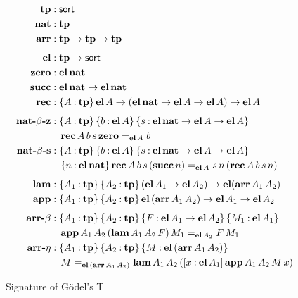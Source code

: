 \documentclass[11pt,twoside]{article}
\newcommand{\braces}[1]{\{#1\}}
\newcommand{\bracks}[1]{[#1]}
\newcommand{\parens}[1]{(#1)}
\newcommand{\sortclass}{\ensuremath{\textsf{sort}}}
\newcommand{\eqclass}[3]{{#2}=_{#1}{#3}}
\newcommand{\piclass}[3]{\braces{{#2}\mathbin{:}{#1}}\,{#3}}
\newcommand{\arrclass}[2]{{#1}\to{#2}}
\newcommand{\lamobj}[3]{\bracks{{#2}\mathbin{:}{#1}}\,{#3}}
\newcommand{\appobj}[2]{{#1}\,{#2}}
\begin{document}
\begin{figure}
  
  \begin{align*}
    \tpsort
    & : \sortclass \\
    \nattp
    & : \tpsort \\
    \arrtp
    & : \arrclass{\tpsort}{\arrclass{\tpsort}{\tpsort}} \\[1ex]
    \elfam
%
    & : \arrclass{\tpsort}{\sortclass} \\
    \zerocon
    & : \elof{\nattp} \\
    \succcon
    & : \arrclass {\elof{\nattp}}{\elof{\nattp}} \\
    \reccon
    &  :
      \piclass{\tpsort}{A}{
      \arrclass{\elof{A}}{
      \arrclass{\parens{\arrclass{\elof{\nattp}}{\arrclass{\elof{A}}{\elof{A}}}}}{
      \elof{A}}}} \\[1ex] 
%
    \natbetaz
    & :
      \piclass{\tpsort}{A}{
      \piclass{\elof{A}}{b}{
      \piclass{\arrclass{\elof{\nattp}}{\arrclass{\elof{A}}{\elof{A}}}}{s}{
      }}} \\
    & \quad
      \eqclass{\elof{A}}{\recof{A}{b}{s}{\zerocon}}{b} \\
    \natbetas
    & :
      \piclass{\tpsort}{A}{
      \piclass{\elof{A}}{b}{
      \piclass{\arrclass{\elof{\nattp}}{\arrclass{\elof{A}}{\elof{A}}}}{s}{
      }}} \\
    & \quad
      \piclass{\elof{\nattp}}{n}{
      \eqclass{\elof{A}}
      {\recof{A}{b}{s}{\parens{\succof{n}}}}
      {\appobj{\appobj{s}{n}}{\parens{\recof{A}{b}{s}{n}}}}} \\[1ex]
%
    \lamcon
    & :
      \piclass{\tpsort}{A_{1}}{
      \piclass{\tpsort}{A_{2}}{
      \arrclass{\parens{\arrclass{\elof{A_{1}}}{\elof{A_{2}}}}}{
      \elfam{\parens{\arrof{A_{1}}{A_{2}}}}}}} \\
    \appcon
    & :
      \piclass{\tpsort}{A_{1}}{
      \piclass{\tpsort}{A_{2}}{
      \arrclass{\elofp{\arrof{A_{1}}{A_{2}}}}{
      \arrclass{\elof{A_{1}}}{\elof{A_{2}}}}}} \\[1ex]
%
    \arrbeta
    & :
      \piclass{\tpsort}{A_{1}}{
      \piclass{\tpsort}{A_{2}}{
      \piclass{\arrclass{\elof{A_{1}}}{\elof{A_{2}}}}{F}{
      \piclass{\elof{A_{1}}}{M_1}{
      }}}} \\
    & \quad
      \eqclass{\elof{A_{2}}}
      {\appof{A_{1}}{A_{2}}{\parens{\lamof{A_{1}}{A_{2}}{F}}}{M_1}}
      {\appobj{F}{M_1}} \\
    \arreta
    & :
      \piclass{\tpsort}{A_{1}}{
      \piclass{\tpsort}{A_{2}}{
      \piclass{\elofp{\arrof{A_{1}}{A_{2}}}}{M}{
      }}} \\
    & \quad
      \eqclass{\elofp{\arrof{A_{1}}{A_{2}}}}
      {M}
      {\lamof{A_{1}}{A_{2}}{\parens{\lamobj{\elof{A_{1}}}{x}{\appof{A_{1}}{A_{2}}{M}{x}}}}}
  \end{align*}

  \caption{Signature of G\"odel's T}
  \label{fig:t-sig}
\end{figure}
\end{document}
